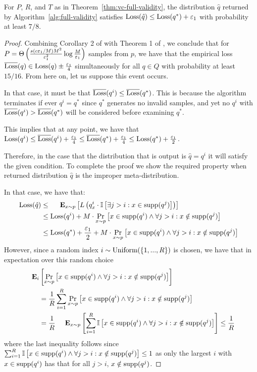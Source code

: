 \begin{lemma}
\label{lem:vc-full-validity-loss}
For $P$, $R$, and $T$ as in Theorem~\ref{thm:vc-full-validity}, 
the distribution $\hat{q}$ returned by Algorithm~\ref{alg:full-validity} satisfies $\text{Loss}(\hat q) \le \text{Loss}(q^*) + \varepsilon_1$ with probability at least $7/8$.
\end{lemma}
\begin{proof}
Combining Corollary 2 of \cite{Haussler92} with Theorem 1 of \cite{MendelsonV03}, 
we conclude that for $P=\Theta\left(\frac{s(c\varepsilon_{1}/M) M^2}{\varepsilon_1^2} \log \frac{M}{\varepsilon_{1}} \right)$ samples from $p$, 
we have that the empirical loss $\overline {\text{Loss}}(q) \in \text{Loss}(q) \pm \frac {\varepsilon_1} 4$ simultaneously for all $q \in Q$ with probability at least $15/16$. 
From here on, let us suppose this event occurs.

In that case, it must be that $\overline {\text{Loss}}(q^i) \le \overline {\text{Loss}}(q^*)$. 
This is because the algorithm terminates if ever $q^i = q^*$ since $q^*$ generates no invalid samples,
and yet no $q^i$ with $\overline {\text{Loss}}(q^i) > \overline {\text{Loss}}(q^*)$ will be considered before examining $q^*$.

This implies that at any point, we have that $\text{Loss}(q^i) \le \overline {\text{Loss}}(q^i) + \frac {\varepsilon_1} 4 \le \overline {\text{Loss}}(q^*) + \frac {\varepsilon_1} 4 \le \text{Loss}(q^*) + \frac {\varepsilon_1} 2$. 

Therefore, in the case that the distribution that is output is $\hat q = q^i$ it will satisfy the given condition.
To complete the proof we show the required property when returned distribution $\hat q$ is the improper meta-distribution.
  
In that case, we have that:
    \begin{align*}
      \Loss(\hat q) 
  &\le \Exp_{x\sim p}\left[ L\left(q_x^i \cdot \Ind\left[\exists j > i: x \in \Supp(q^j) \right] \right) \right] \\
  &\le \Loss(q^i) + M \cdot \Pr_{x\sim p}\left[ x \in \Supp(q^i) \wedge \forall j > i: x \notin \Supp(q^j) \right] \\
  &\le \Loss(q^*) + \frac {\eps_1} 2 + M \cdot \Pr_{x\sim p}\left[ x \in \Supp(q^i) \wedge \forall j > i: x \notin \Supp(q^j) \right]
    \end{align*}
However, since a random index $i \sim \text{Uniform}(\{1,...,R\})$ is chosen, we have that in expectation over this random choice
    \begin{align*}
\Exp_i&\left[ \Pr_{x\sim p}\left[ x \in \Supp(q^i) \wedge \forall j > i: x \notin \Supp(q^j) \right] \right] \\
&= \frac 1 R \sum_{i=1}^R \Pr_{x\sim p}\left[ x \in \Supp(q^i) \wedge \forall j > i: x \notin \Supp(q^j) \right] \\
&= \frac 1 R \Exp_{x\sim p} \left[ \sum_{i=1}^R \Ind\left[ x \in \Supp(q^i) \wedge \forall j > i: x \notin \Supp(q^j) \right] \right] 
\le \frac 1 R
   \end{align*}
  where the last inequality follows since $\sum_{i=1}^R \mathbb{I}\left[ x \in \text{supp}(q^i) \wedge \forall j > i: x \notin \text{supp}(q^j) \right] \le 1 $ as only the largest $i$ with $x \in \text{supp}(q^i)$ has that for all $j > i$, $x \notin \text{supp}(q^j)$.


\end{proof}

